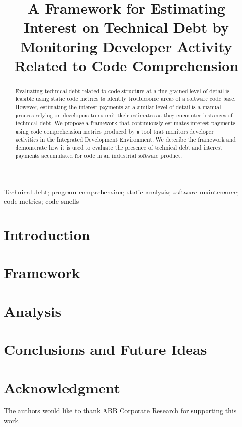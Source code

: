 \documentclass[conference]{IEEEtran}
\begin{document}
\title{A Framework for Estimating Interest on Technical Debt by Monitoring Developer Activity Related to Code Comprehension}

\author{
\and
{}
}

\maketitle

\begin{abstract}
Evaluating technical debt related to code structure at a fine-grained level of detail is feasible using static code metrics to identify troublesome areas of a software code base.  However, estimating the interest payments at a similar level of detail is a manual process relying on developers to submit their estimates as they encounter instances of technical debt.  We propose a framework that continuously estimates interest payments using code comprehension metrics produced by a tool that monitors developer activities in the Integrated Development Environment.  We describe the framework and demonstrate how it is used to evaluate the presence of technical debt and interest payments accumulated for code in an industrial software product.
\end{abstract}

\begin{IEEEkeywords}
Technical debt; program comprehension; static analysis; software maintenance; code metrics; code smells
\end{IEEEkeywords}

\section{Introduction}


\section{Framework}

\label{sec:DataFramework}
%

\section{Analysis}
\label{sec:AnalysisResults}


\section{Conclusions and Future Ideas}

\vspace*{-4mm}
\section*{Acknowledgment}
The authors would like to thank ABB Corporate Research for supporting this work.



\end{document}
